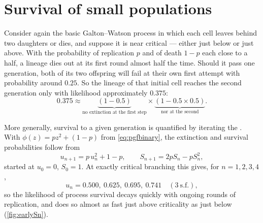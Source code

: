 \section{Survival of small populations}
\label{sec:small}

Consider again the basic Galton--Watson process in which each cell leaves behind two
daughters or dies, and suppose it is near critical --- either just below or just
above. With the probability of replication $p$ and of death $1-p$ each close to a
half, a lineage dies out at its first round almost half the time. Should it pass one
generation, both of its two offspring will fail at their own first attempt with
probability around $0.25$. So the lineage of that initial cell reaches the second
generation only with likelihood approximately $0.375$:
\begin{equation*}
0.375 \approx \underbrace{(1-0.5)}_{\text{no extinction at the first step}}\times\underbrace{(1-0.5\times0.5)}_{\text{nor at the second}} .
\end{equation*}

More generally, survival to a given generation is quantified by iterating the
\pgf{}. With $\phi(z) = pz^2 + (1-p)$ from \cref{eq:pgfbinary}, the extinction and
survival probabilities follow from
\begin{equation}
\label{ext}
u_{n+1} = p\,u_n^2 + 1-p ,
\qquad
S_{n+1} = 2pS_n - pS_n^2 ,
\end{equation}
started at $u_0 = 0$, $S_0 = 1$. At exactly critical branching this gives, for
$n = 1,2,3,4$,
\begin{equation*}
u_n = 0.500,\ 0.625,\ 0.695,\ 0.741\quad(3\ \text{s.f.}),
\end{equation*}
so the likelihood of process survival decays quickly with ongoing rounds of
replication, and does so almost as fast just above criticality as just below
(\cref{fig:earlySn}).

